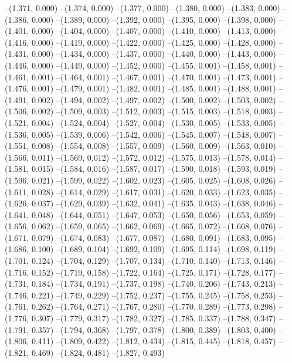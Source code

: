 {--(1.371, 0.000)
--(1.374, 0.000)
--(1.377, 0.000)
--(1.380, 0.000)
--(1.383, 0.000)
--(1.386, 0.000)
--(1.389, 0.000)
--(1.392, 0.000)
--(1.395, 0.000)
--(1.398, 0.000)
--(1.401, 0.000)
--(1.404, 0.000)
--(1.407, 0.000)
--(1.410, 0.000)
--(1.413, 0.000)
--(1.416, 0.000)
--(1.419, 0.000)
--(1.422, 0.000)
--(1.425, 0.000)
--(1.428, 0.000)
--(1.431, 0.000)
--(1.434, 0.000)
--(1.437, 0.000)
--(1.440, 0.000)
--(1.443, 0.000)
--(1.446, 0.000)
--(1.449, 0.000)
--(1.452, 0.000)
--(1.455, 0.001)
--(1.458, 0.001)
--(1.461, 0.001)
--(1.464, 0.001)
--(1.467, 0.001)
--(1.470, 0.001)
--(1.473, 0.001)
--(1.476, 0.001)
--(1.479, 0.001)
--(1.482, 0.001)
--(1.485, 0.001)
--(1.488, 0.001)
--(1.491, 0.002)
--(1.494, 0.002)
--(1.497, 0.002)
--(1.500, 0.002)
--(1.503, 0.002)
--(1.506, 0.002)
--(1.509, 0.003)
--(1.512, 0.003)
--(1.515, 0.003)
--(1.518, 0.003)
--(1.521, 0.004)
--(1.524, 0.004)
--(1.527, 0.004)
--(1.530, 0.005)
--(1.533, 0.005)
--(1.536, 0.005)
--(1.539, 0.006)
--(1.542, 0.006)
--(1.545, 0.007)
--(1.548, 0.007)
--(1.551, 0.008)
--(1.554, 0.008)
--(1.557, 0.009)
--(1.560, 0.009)
--(1.563, 0.010)
--(1.566, 0.011)
--(1.569, 0.012)
--(1.572, 0.012)
--(1.575, 0.013)
--(1.578, 0.014)
--(1.581, 0.015)
--(1.584, 0.016)
--(1.587, 0.017)
--(1.590, 0.018)
--(1.593, 0.019)
--(1.596, 0.021)
--(1.599, 0.022)
--(1.602, 0.023)
--(1.605, 0.025)
--(1.608, 0.026)
--(1.611, 0.028)
--(1.614, 0.029)
--(1.617, 0.031)
--(1.620, 0.033)
--(1.623, 0.035)
--(1.626, 0.037)
--(1.629, 0.039)
--(1.632, 0.041)
--(1.635, 0.043)
--(1.638, 0.046)
--(1.641, 0.048)
--(1.644, 0.051)
--(1.647, 0.053)
--(1.650, 0.056)
--(1.653, 0.059)
--(1.656, 0.062)
--(1.659, 0.065)
--(1.662, 0.069)
--(1.665, 0.072)
--(1.668, 0.076)
--(1.671, 0.079)
--(1.674, 0.083)
--(1.677, 0.087)
--(1.680, 0.091)
--(1.683, 0.095)
--(1.686, 0.100)
--(1.689, 0.104)
--(1.692, 0.109)
--(1.695, 0.114)
--(1.698, 0.119)
--(1.701, 0.124)
--(1.704, 0.129)
--(1.707, 0.134)
--(1.710, 0.140)
--(1.713, 0.146)
--(1.716, 0.152)
--(1.719, 0.158)
--(1.722, 0.164)
--(1.725, 0.171)
--(1.728, 0.177)
--(1.731, 0.184)
--(1.734, 0.191)
--(1.737, 0.198)
--(1.740, 0.206)
--(1.743, 0.213)
--(1.746, 0.221)
--(1.749, 0.229)
--(1.752, 0.237)
--(1.755, 0.245)
--(1.758, 0.253)
--(1.761, 0.262)
--(1.764, 0.271)
--(1.767, 0.280)
--(1.770, 0.289)
--(1.773, 0.298)
--(1.776, 0.307)
--(1.779, 0.317)
--(1.782, 0.327)
--(1.785, 0.337)
--(1.788, 0.347)
--(1.791, 0.357)
--(1.794, 0.368)
--(1.797, 0.378)
--(1.800, 0.389)
--(1.803, 0.400)
--(1.806, 0.411)
--(1.809, 0.422)
--(1.812, 0.434)
--(1.815, 0.445)
--(1.818, 0.457)
--(1.821, 0.469)
--(1.824, 0.481)
--(1.827, 0.493)
}
